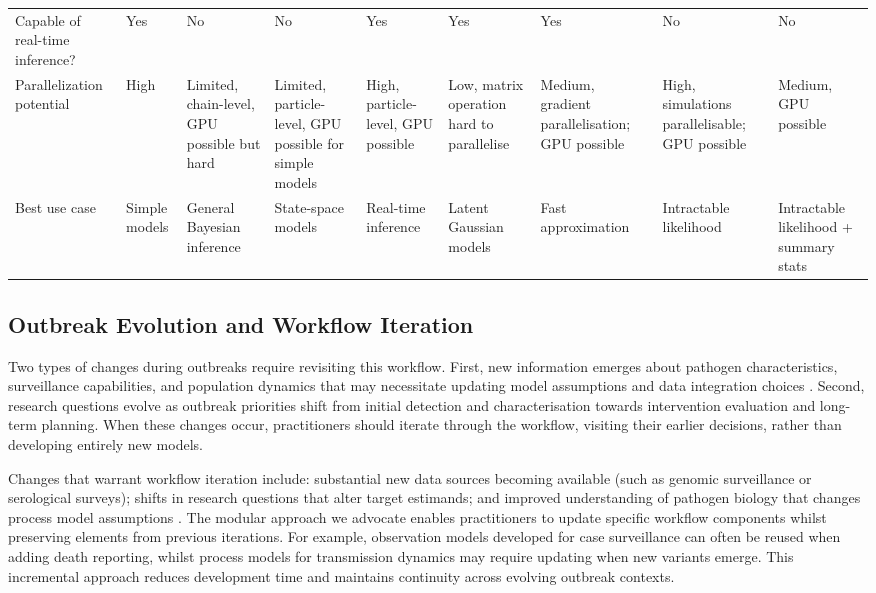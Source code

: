\documentclass{article}
\begin{document}
\begin{landscape}
\begin{table}[ht]
\begin{tabular}{@{}p{3.2cm}p{1.5cm}p{1.5cm}p{1.5cm}p{1.5cm}p{1.5cm}p{1.5cm}p{1.5cm}p{1.5cm}@{}}
Capable of real-time inference? & Yes & No & No & Yes & Yes & Yes & No & No \\
Parallelization potential & 
High & 
Limited, chain-level, GPU possible but hard & 
Limited, particle-level, GPU possible for simple models & 
High, particle-level, GPU possible & 
Low, matrix operation hard to parallelise & 
Medium, gradient parallelisation; GPU possible & 
High, simulations parallelisable; GPU possible & 
Medium, GPU possible \\
Best use case & Simple models & General Bayesian inference & State-space models & Real-time inference & Latent Gaussian models & Fast approximation & Intractable likelihood & Intractable likelihood + summary stats \\
\bottomrule
\end{tabular}
\end{table}
\end{landscape}

\subsection{Outbreak Evolution and Workflow Iteration}

Two types of changes during outbreaks require revisiting this workflow.
First, new information emerges about pathogen characteristics, surveillance capabilities, and population dynamics that may necessitate updating model assumptions and data integration choices \citep{mccaw2023role}.
Second, research questions evolve as outbreak priorities shift from initial detection and characterisation towards intervention evaluation and long-term planning.
When these changes occur, practitioners should iterate through the workflow, visiting their earlier decisions, rather than developing entirely new models.

Changes that warrant workflow iteration include: substantial new data sources becoming available (such as genomic surveillance or serological surveys); shifts in research questions that alter target estimands; and improved understanding of pathogen biology that changes process model assumptions \citep{knock2021key}.
The modular approach we advocate enables practitioners to update specific workflow components whilst preserving elements from previous iterations.
For example, observation models developed for case surveillance can often be reused when adding death reporting, whilst process models for transmission dynamics may require updating when new variants emerge.
This incremental approach reduces development time and maintains continuity across evolving outbreak contexts.
\end{document}
